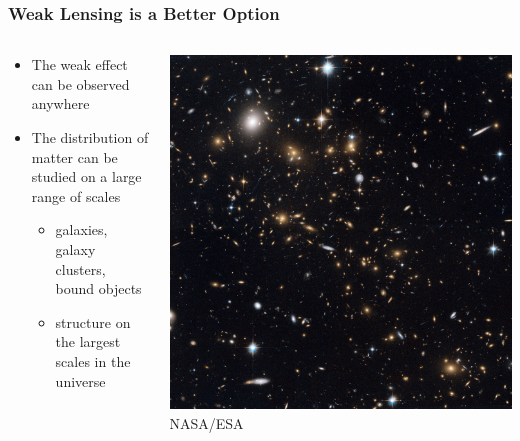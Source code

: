 \documentclass{beamer}
\begin{document}
\frame
{
    \frametitle{Weak Lensing is a Better Option}

    \begin{columns}
        \begin{column}{0.5\textwidth}    
            \begin{itemize}

                \item The weak effect can be observed anywhere
                \item The distribution of matter can be studied on a large range of scales
                \begin{itemize}
                    \item galaxies, galaxy clusters, bound objects
                    \item structure on the largest scales in the universe
                \end{itemize}

            \end{itemize}
        \end{column}
        \begin{column}{0.5\textwidth}
            \begin{center}
                \includegraphics[width=\textwidth]{macs-cluster.jpg}
                \newline
                {\tiny NASA/ESA}
            \end{center}
        \end{column}
    \end{columns}
}
\end{document}
